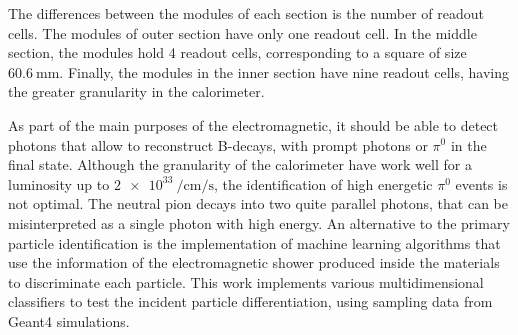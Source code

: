 The differences between the modules of each section is the number of readout
cells. The modules of outer section have only one readout cell. In the middle
section, the modules hold 4 readout cells, corresponding to a square of size
\(\SI{60.6}{\milli\metre}\). Finally, the modules in the inner section have
nine readout cells, having the greater granularity in the
calorimeter\cite{omelaenko2000lhcb}.

As part of the main purposes of the electromagnetic, it should be able to
detect photons that allow to reconstruct B-decays, with prompt photons or
\(\pi^0\) in the final state\cite{omelaenko2000lhcb, Boldyrev_2020}. Although
the granularity of the calorimeter have work well for a luminosity up to
\(\SI{2e33}{\per\centi\metre\per\second}\)\cite{guz2013lhcb}, the
identification of high energetic \(\pi^0\) events is not optimal. The neutral
pion decays into two quite parallel photons, that can be misinterpreted as a
single photon with high energy. An alternative to the primary particle
identification is the implementation of machine learning algorithms that use
the information of the electromagnetic shower produced inside the materials to
discriminate each particle\cite{Boldyrev_2020}. This work implements various
multidimensional classifiers to test the incident particle differentiation,
using sampling data from Geant4 simulations.
